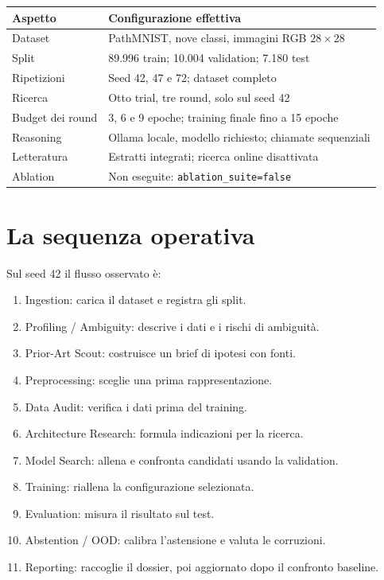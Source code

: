 \documentclass[11pt,a4paper]{article}
\newcommand{\artefatto}[1]{\nolinkurl{#1}}
\begin{document}
\begin{tabularx}{\textwidth}{@{}lX@{}}
\toprule
\textbf{Aspetto} & \textbf{Configurazione effettiva}\\
\midrule
Dataset & PathMNIST, nove classi, immagini RGB $28\times28$\\
Split & 89.996 train; 10.004 validation; 7.180 test\\
Ripetizioni & Seed 42, 47 e 72; dataset completo\\
Ricerca & Otto trial, tre round, solo sul seed 42\\
Budget dei round & 3, 6 e 9 epoche; training finale fino a 15 epoche\\
Reasoning & Ollama locale, modello richiesto; chiamate sequenziali\\
Letteratura & Estratti integrati; ricerca online disattivata\\
Ablation & Non eseguite: \artefatto{ablation_suite=false}\\
\bottomrule
\end{tabularx}

\section{La sequenza operativa}

Sul seed 42 il flusso osservato è:
\begin{enumerate}
\item Ingestion: carica il dataset e registra gli split.
\item Profiling / Ambiguity: descrive i dati e i rischi di ambiguità.
\item Prior-Art Scout: costruisce un brief di ipotesi con fonti.
\item Preprocessing: sceglie una prima rappresentazione.
\item Data Audit: verifica i dati prima del training.
\item Architecture Research: formula indicazioni per la ricerca.
\item Model Search: allena e confronta candidati usando la validation.
\item Training: riallena la configurazione selezionata.
\item Evaluation: misura il risultato sul test.
\item Abstention / OOD: calibra l'astensione e valuta le corruzioni.
\item Reporting: raccoglie il dossier, poi aggiornato dopo il confronto baseline.
\end{enumerate}
\end{document}
